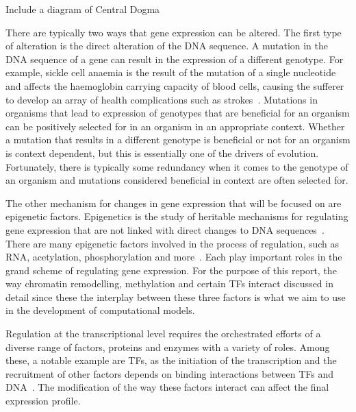         \begin{center}
            Include a diagram of Central Dogma
        \end{center}
        
        There are typically two ways that gene expression can be altered.
        The first type of alteration is the direct alteration of the DNA sequence. A mutation in the DNA sequence of a gene can result in the expression of a different genotype.        %
        For example, sickle cell anaemia is the result of the mutation of a single nucleotide and affects the haemoglobin carrying capacity of blood cells, causing the sufferer to develop an array of health complications such as strokes~\cite{clancy2008dna}. 
        Mutations in organisms that lead to expression of genotypes that are beneficial for an organism can be positively selected for in an organism in an appropriate context. Whether a mutation that results in a different genotype is beneficial or not for an organism is context dependent, but this is essentially one of the drivers of evolution. Fortunately, there is typically some redundancy when it comes to the genotype of an organism and mutations considered beneficial in context are often selected for.
        
        The other mechanism for changes in gene expression that will be focused on are epigenetic factors. Epigenetics is the study of heritable mechanisms for regulating gene expression that are not linked with direct changes to DNA sequences~\cite{holliday2006epigenetics}. There are many epigenetic factors involved in the process of regulation, such as RNA, acetylation, phosphorylation and more~\cite{geiman2002chromatin, jaenisch2003epigenetic, holoch2015rna, waterland2003transposable}. Each play important roles in the grand scheme of regulating gene expression. For the purpose of this report, the way chromatin remodelling, methylation and certain TFs interact discussed in detail since these the interplay between these three factors is what we aim to use in the development of computational models.


        Regulation at the transcriptional level requires the orchestrated efforts of a diverse range of factors, proteins and enzymes with a variety of roles. Among these, a notable example are TFs, as the initiation of the transcription and the recruitment of other factors depends on binding interactions between TFs and DNA~\cite{lemon2000orchestrated}. The modification of the way these factors interact can affect the final expression profile. 
        
